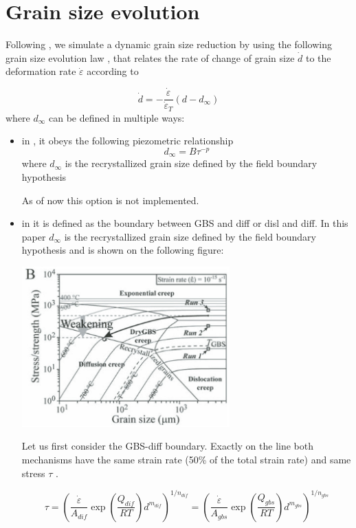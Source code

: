 \documentclass[a4paper]{article}
\begin{document}
\section{Grain size evolution \label{seq:gsev}}

Following \textcite{prgu09}, we simulate a dynamic grain size reduction
by using the following grain size evolution law \textcite{brcp99}, that relates
the rate of change of grain size $\dot{d}$ to the 
deformation rate $\dot{\varepsilon}$ according to

\[
\dot{d} = -\frac{\dot\varepsilon}{\dot\varepsilon_T} (d-d_\infty)
\]
where $d_\infty$ can be defined in multiple ways:
\begin{itemize}
\item in \textcite{brcp99}, it obeys the following piezometric relationship
\[
d_\infty = B \tau^{-p}
\]
where $d_\infty$ is the recrystallized grain size defined
by the field boundary hypothesis

As of now this option is not implemented.

\item in \textcite{prgu09} it is defined as the boundary between
GBS and diff or disl and diff.
In this paper $d_\infty$ is the recrystallized grain size defined
by the field boundary hypothesis
and is  shown on the following figure:

\begin{center}
\includegraphics[width=8cm]{images/prgu09}
\end{center}

Let us first consider the GBS-diff boundary. Exactly on the line 
both mechanisms have the same strain rate (50\% of the total strain rate)
and same stress $\tau$ .

\[
\tau
=
\left(\frac{\dot\varepsilon}{A_{dif}}\exp\left(\frac{Q_{dif}}{RT} \right) d^{m_{dif}} \right)^{1/n_{dif}}
=
\left(\frac{\dot\varepsilon}{A_{gbs}} \exp\left(\frac{Q_{gbs}}{RT} \right)  d^{m_{gbs}} \right)^{1/n_{gbs}}
\]


\end{itemize}
\end{document}
